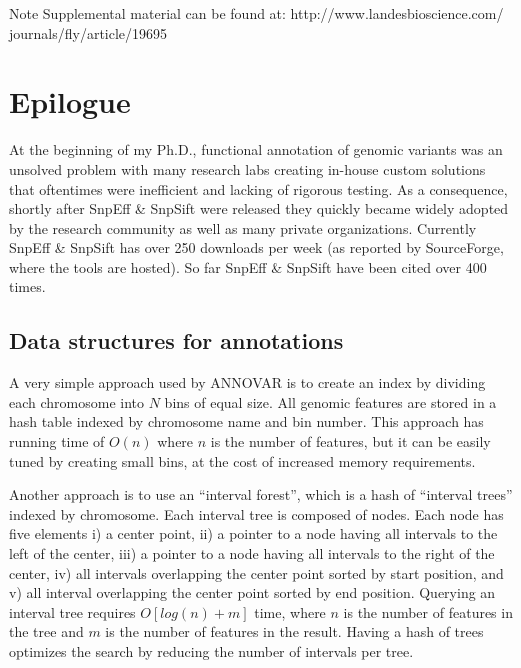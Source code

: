Note Supplemental material can be found at: http://www.landesbioscience.com/ journals/fly/article/19695

\section{Epilogue}

At the beginning of my Ph.D., functional annotation of genomic variants was an unsolved problem with many research labs creating in-house custom solutions that oftentimes were inefficient and lacking of rigorous testing. As a consequence, shortly after SnpEff \& SnpSift were released they quickly became widely adopted by the research community as well as many private organizations. Currently SnpEff \& SnpSift has over 250 downloads per week (as reported by  SourceForge, where the tools are hosted). So far SnpEff \& SnpSift  have been cited over 400 times.

\subsection{Data structures for annotations}

A very simple approach used by ANNOVAR \cite{wang2010annovar} is to create an index by dividing each chromosome into $N$ bins of equal size. All genomic features are stored in a hash table indexed by chromosome name and bin number. This approach has running time of $O(n)$ where $n$ is the number of features, but it can be easily tuned by creating small bins, at the cost of increased memory requirements.

Another approach \cite{cingolani2012program} is to use an ``interval forest'', which is a hash of ``interval trees'' indexed by chromosome. Each interval tree is composed of nodes. Each node has five elements i) a center point, ii) a pointer to a node having all intervals to the left of the center, iii) a pointer to a node having all intervals to the right of the center, iv) all intervals overlapping the center point sorted by start position, and v) all interval overlapping the center point sorted by end position. Querying an interval tree requires $O[log(n) + m]$ time, where $n$ is the number of features in the tree and $m$ is the number of features in the result. Having a hash of trees optimizes the search by reducing the number of intervals per tree.
